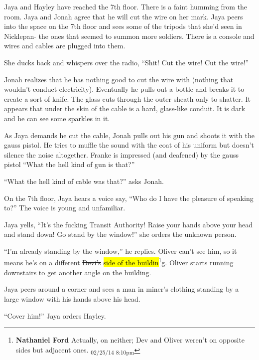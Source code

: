 Jaya and Hayley have reached the 7th floor.  There is a faint humming from the room.  Jaya and Jonah agree that he will cut the wire on her mark.  Jaya peers into the space on the 7th floor and sees some of the tripods that she'd seen in Nicklepan- the ones that seemed to summon more soldiers.  There is a console and wires and cables are plugged into them.

She ducks back and whispers over the radio, ``Shit!  Cut the wire!  Cut the wire!''



Jonah realizes that he has nothing good to cut the wire with (nothing that wouldn't conduct electricity). Eventually he pulls out a bottle and breaks it to create a sort of knife.  The glass cuts through the outer sheath only to shatter.  It appears that under the skin of the cable is a hard, glass-like conduit.  It is dark and he can see some sparkles in it.



As Jaya demands he cut the cable, Jonah pulls out his gun and shoots it with the gauss pistol.  He tries to muffle the sound with the coat of his uniform but doesn't silence the noise altogether. Franke is impressed (and deafened) by the gauss pistol ``What the hell kind of gun is that?''  

``What the hell kind of cable was that?'' asks Jonah.



On the 7th floor, Jaya hears a voice say, ``Who do I have the pleasure of speaking to?''  The voice is young and unfamiliar.



Jaya yells, ``It's the fucking Transit Authority!  Raise your hands above your head and stand down!  Go stand by the window!'' she orders the unknown person.  

``I'm already standing by the window,'' he replies.  Oliver can't see him, so it means he's on a different  \sout{Devi's}\hl{ side of the buildin}\footnote{\textbf{Nathaniel Ford }Actually, on neither; Dev and Oliver weren't on opposite sides but adjacent ones. \textsubscript{02/25/14 8:10pm}}g.  Oliver starts running downstairs to get another angle on the building.



Jaya peers around a corner and sees a man in miner's clothing standing by a large window with his hands above his head.



``Cover him!'' Jaya orders Hayley.

